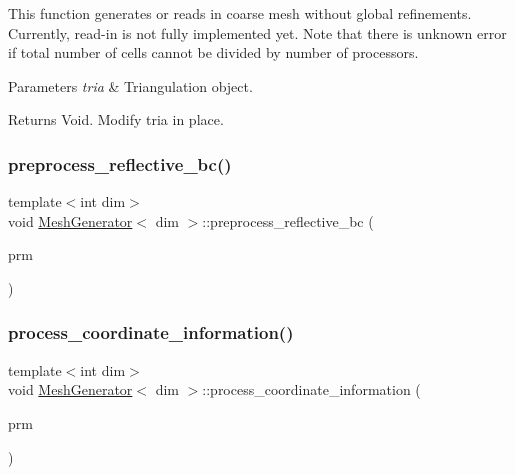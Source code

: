 This function generates or reads in coarse mesh without global refinements. Currently, read-\/in is not fully implemented yet. Note that there is unknown error if total number of cells cannot be divided by number of processors.


\begin{DoxyParams}{Parameters}
{\em tria} & Triangulation object. \\
\hline
\end{DoxyParams}
\begin{DoxyReturn}{Returns}
Void. Modify tria in place. 
\end{DoxyReturn}
\mbox{\label{class_mesh_generator_a93d10aa06b5b638a859e2fc53dbea5e0}} 
\subsubsection{\texorpdfstring{preprocess\+\_\+reflective\+\_\+bc()}{preprocess\_reflective\_bc()}}
{\footnotesize\ttfamily template$<$int dim$>$ \\
void \hyperlink{class_mesh_generator}{Mesh\+Generator}$<$ dim $>$\+::preprocess\+\_\+reflective\+\_\+bc (\begin{DoxyParamCaption}\item[{Parameter\+Handler \&}]{prm }\end{DoxyParamCaption})\hspace{0.3cm}{\ttfamily [private]}}

\mbox{\label{class_mesh_generator_a253330ef901e2a915576f6d6cd4262b5}} 
\subsubsection{\texorpdfstring{process\+\_\+coordinate\+\_\+information()}{process\_coordinate\_information()}}
{\footnotesize\ttfamily template$<$int dim$>$ \\
void \hyperlink{class_mesh_generator}{Mesh\+Generator}$<$ dim $>$\+::process\+\_\+coordinate\+\_\+information (\begin{DoxyParamCaption}\item[{Parameter\+Handler \&}]{prm }\end{DoxyParamCaption})\hspace{0.3cm}{\ttfamily [private]}}

